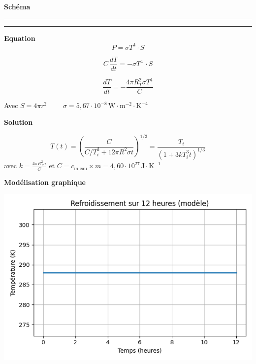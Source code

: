 \documentclass[a4paper,12pt]{article}
\begin{document}
\textbf{Schéma}
\\
\noindent\textcolor{gray}{\rule{\linewidth}{0.4pt}}

    
\begin{center}
  
\end{center}



\noindent\textcolor{gray}{\rule{\linewidth}{0.4pt}} 

\vspace{1cm}

\textbf{Equation}
\[   P = \sigma T^4 \cdot S
\]

\[    C \, \frac{dT}{dt} = - \sigma T^4 \,  \cdot S
\]

\[\frac{dT}{dt} = - \frac{4 \pi R_T^2 \sigma T^4}{C}\]  

Avec 
\(S= 4\pi r^2\)
\ \ \ \
\(\sigma=5{,}67 \cdot 10^{-8} \, \mathrm{W \cdot m^{-2} \cdot K^{-4}}\)

\vspace{0.5cm} 
\textbf{Solution} 

\[
T(t) = \left( \frac{C}{C/T_i^3 + 12\pi R^2 \sigma t} \right)^{1/3} 
= \frac{T_i}{\left(1 + 3k T_i^3 t \right)^{1/3}}
\]
avec \(k=\frac{4\pi R_T^2 \sigma}{C}\)  
et \(C=c_{\text{m eau}}\times m=4{,}60 \cdot 10^{27} \, \mathrm{J \cdot K^{-1}}\)

\vspace{1cm} 
\textbf{Modélisation graphique} 

\begin{center}
  \includegraphics[width=0.8\linewidth]{../modele1/figures/modele1.png}
\end{center}
\end{document}
